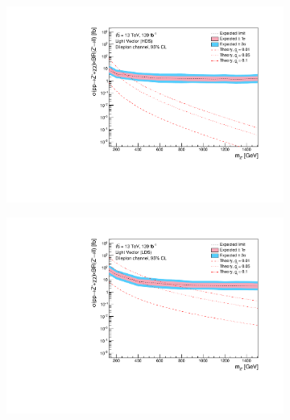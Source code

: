\documentclass[12pt, a4paper]{book}
\begin{document}
\begin{figure}[!ht]
\begin{subfigure}[b]{0.49\textwidth}
   \end{subfigure}
   \hfill
   \begin{subfigure}[b]{0.49\textwidth}
      \centering
      \includegraphics[width=1\textwidth]{Limits/LV_HDS/mass_exclusion_comb.pdf}
   \end{subfigure}
   \hfill
   \begin{subfigure}[b]{0.49\textwidth}
      \centering
      \includegraphics[width=1\textwidth]{Limits/LV_LDS/mass_exclusion_comb.pdf}
   \end{subfigure}
   \hfill
	\begin{subfigure}[b]{0.49\textwidth}
      \centering

\end{subfigure}
\end{figure}
\end{document}
